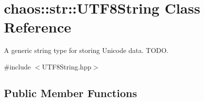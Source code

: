 \hypertarget{classchaos_1_1str_1_1_u_t_f8_string}{}\section{chaos\+:\+:str\+:\+:U\+T\+F8\+String Class Reference}
\label{classchaos_1_1str_1_1_u_t_f8_string}


A generic string type for storing Unicode data. T\+O\+D\+O.  




{\ttfamily \#include $<$U\+T\+F8\+String.\+hpp$>$}

\subsection*{Public Member Functions}

